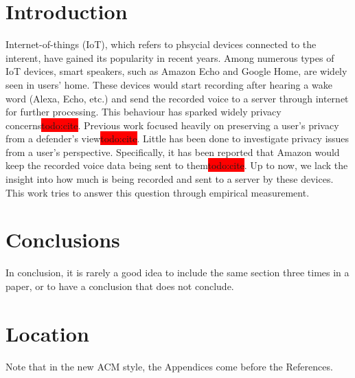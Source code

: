 \section{Introduction}
Internet-of-things (IoT), which refers to phsycial devices connected to the interent, have gained its popularity in recent years. Among numerous types of IoT devices, smart speakers, such as Amazon Echo and Google Home, are widely seen in users' home. These devices would start recording after hearing a wake word (Alexa, Echo, etc.) and send the recorded voice to a server through internet for further processing. This behaviour has sparked widely privacy concerns\colorbox{red}{todo:cite}. Previous work focused heavily on preserving a user's privacy from a defender's view\colorbox{red}{todo:cite}. Little has been done to investigate privacy issues from a user's perspective. Specifically, it has been reported that Amazon would keep the recorded voice data being sent to them\colorbox{red}{todo:cite}. Up to now, we lack the insight into how much is being recorded and sent to a server by these devices. This work tries to answer this question through empirical measurement.








\section{Conclusions}

In conclusion, it is rarely a good idea to include the same section three times in a paper, or to have a conclusion that does not conclude.

\appendix

\section{Location}

Note that in the new ACM style, the Appendices come before the References.



